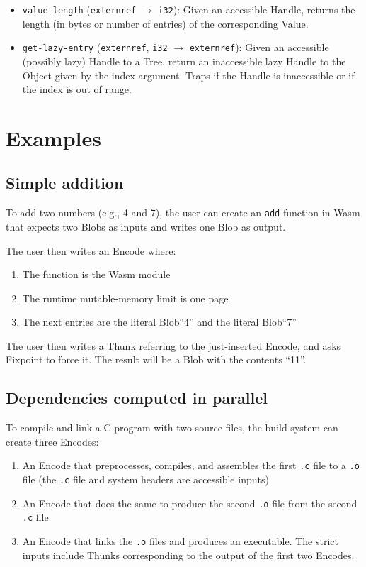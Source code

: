 \documentclass{article}
\newcommand{\blob}{\textrm{Blob}\xspace}
\newcommand{\blobs}{\textrm{Blob}s\xspace}
\newcommand{\valuex}{\textrm{Value}\xspace}
\newcommand{\object}{\textrm{Object}\xspace}
\newcommand{\encode}{\textrm{Encode}\xspace}
\newcommand{\thunk}{\textrm{Thunk}\xspace}
\newcommand{\thunks}{\textrm{Thunk}s\xspace}
\newcommand{\encodes}{\textrm{Encode}s\xspace}
\newcommand{\tree}{\textrm{Tree}\xspace}
\newcommand{\handle}{\textrm{Handle}\xspace}
\newcommand{\bs}{\vspace{\baselineskip}}
\begin{document}
\begin{itemize}
\item \texttt{value-length} (\texttt{externref} $\rightarrow$ \texttt{i32}): Given an accessible \handle, returns the length (in bytes or number of entries) of the corresponding \valuex.

\item \texttt{get-lazy-entry} (\texttt{externref}, \texttt{i32}
  $\rightarrow$ \texttt{externref}): Given an accessible (possibly
  lazy) \handle to a \tree, return an inaccessible lazy \handle to the
  \object given by the index argument. Traps if the \handle is
  inaccessible or if the index is out of range.
\end{itemize}

\section{Examples}

\subsection{Simple addition} To add two numbers (e.g., 4 and
7), the user can create an \texttt{add} function in Wasm that expects
two \blobs as inputs and writes one \blob as output.

\bs

The user then writes an \encode where:
\begin{enumerate}[itemsep=0pt]
\item The function is the Wasm module
\item The runtime mutable-memory limit is one page
\item The next entries are the literal \blob ``4'' and the literal \blob ``7''
\end{enumerate}

The user then writes a \thunk referring to the just-inserted \encode,
and asks Fixpoint to force it. The result will be a \blob with the
contents ``11''.

\subsection{Dependencies computed in parallel} To compile and link a C program with two source files,
the build system can create three \encodes:
\begin{enumerate}[itemsep=0pt]
\item An \encode that preprocesses, compiles, and assembles the first \texttt{.c} file to a \texttt{.o} file
  (the \texttt{.c} file and system headers are accessible inputs)
\item An \encode that does the same to produce the second \texttt{.o} file from the second \texttt{.c} file
\item An \encode that links the \texttt{.o} files and produces an executable. The strict inputs include \thunks corresponding to the output of the first two \encodes.
\end{enumerate}
\end{document}
